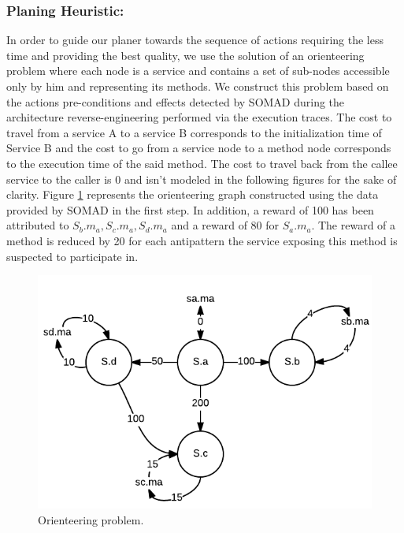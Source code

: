 \documentclass[lnbip]{svmultln}
\begin{document}
\subsubsection{Planing Heuristic: } In order to guide our planer towards the sequence of actions requiring the less time and providing the best quality, we use the solution of an orienteering problem where each node is a service and contains a set of sub-nodes accessible only by him and representing its methods. We construct this problem based on the actions pre-conditions and effects detected by SOMAD during the architecture reverse-engineering performed via the execution traces. The cost to travel from a service A to a service B corresponds to the initialization time of Service B and the cost to go from a service node to a method node corresponds to the execution time of the said method. The cost to travel back from the callee service to the caller is 0 and isn't modeled in the following figures for the sake of clarity. Figure \ref{fig:orienteering} represents the orienteering graph constructed using the data provided by SOMAD in the first step. In addition, a reward of 100 has been attributed to $S_b.m_a, S_c.m_a, S_d.m_a$ and a reward of 80 for $S_a.m_a$. The reward of a method is reduced by 20 for each antipattern the service exposing this method is suspected to participate in. 

\begin{figure}
    \centering
	\includegraphics[scale=0.4]{orienteering.png}
 	\caption{Orienteering problem.}
    \label{fig:orienteering}
\end{figure}
\end{document}
